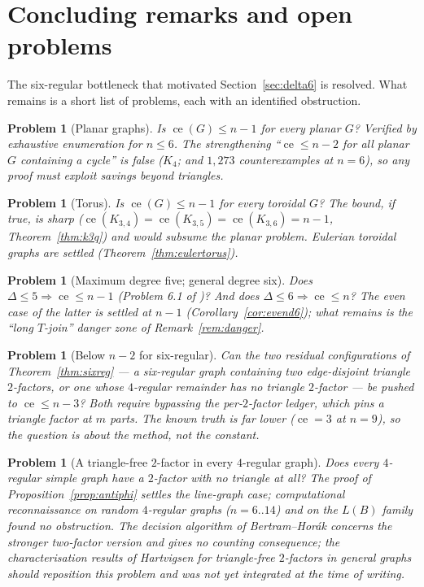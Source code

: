 \documentclass[a4paper,11pt]{amsart}
\newtheorem{problem}[theorem]{Problem}
\theoremstyle{definition}
\theoremstyle{remark}
\newcommand{\ce}{\operatorname{ce}}
\begin{document}
\section{Concluding remarks and open problems}\label{sec:open}

The six-regular bottleneck that motivated Section~\ref{sec:delta6} is resolved. What remains is a short
list of problems, each with an identified obstruction.

\begin{problem}[Planar graphs]\label{prob:planar}
Is $\ce(G)\le n-1$ for every planar $G$? Verified by exhaustive enumeration for $n\le6$. The
strengthening ``$\ce\le n-2$ for all planar $G$ containing a cycle'' is false ($K_4$; and $1{,}273$
counterexamples at $n=6$), so any proof must exploit savings beyond triangles.
\end{problem}

\begin{problem}[Torus]\label{prob:torus}
Is $\ce(G)\le n-1$ for every toroidal $G$? The bound, if true, is sharp
($\ce(K_{3,4})=\ce(K_{3,5})=\ce(K_{3,6})=n-1$, Theorem~\ref{thm:k3q}) and would subsume the planar problem.
Eulerian toroidal graphs are settled (Theorem~\ref{thm:eulertorus}).
\end{problem}

\begin{problem}[Maximum degree five; general degree six]\label{prob:delta56}
Does $\Delta\le5\Rightarrow\ce\le n-1$ (Problem 6.1 of \cite{AABC25})? And does $\Delta\le6\Rightarrow
\ce\le n$? The even case of the latter is settled at $n-1$ (Corollary~\ref{cor:evend6}); what remains is
the ``long $T$-join'' danger zone of Remark~\ref{rem:danger}.
\end{problem}

\begin{problem}[Below $n-2$ for six-regular]\label{prob:sixreg}
Can the two residual configurations of Theorem~\ref{thm:sixreg} --- a six-regular graph containing two
edge-disjoint triangle $2$-factors, or one whose $4$-regular remainder has no triangle $2$-factor --- be
pushed to $\ce\le n-3$? Both require bypassing the per-$2$-factor ledger, which pins a triangle factor at
$m$ parts. The known truth is far lower ($\ce=3$ at $n=9$), so the question is about the method, not the
constant.
\end{problem}

\begin{problem}[A triangle-free $2$-factor in every $4$-regular graph]\label{prob:trianglefree}
Does every $4$-regular simple graph have a $2$-factor with \emph{no} triangle at all? The proof of
Proposition~\ref{prop:antiphi} settles the line-graph case; computational reconnaissance on random
$4$-regular graphs ($n=6..14$) and on the $L(B)$ family found no obstruction. The decision algorithm of
Bertram--Hor\'ak \cite{BH97} concerns the stronger two-factor version and gives no counting consequence;
the characterisation results of Hartvigsen \cite{Hartvigsen24} for triangle-free $2$-factors in general
graphs should reposition this problem and was not yet integrated at the time of writing.
\end{problem}
\end{document}

